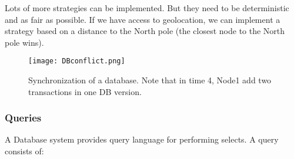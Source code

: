Lots of more strategies can be implemented. But they need to be deterministic and as fair as possible. If we have access to geolocation, we can implement a strategy based on a distance to the North pole (the closest node to the North pole wins).

\begin{figure}[h]
    \centering
    \texttt{[image: DBconflict.png]}
    \caption{Synchronization of a database. Note that in time 4, Node1 add two transactions in one DB version.}
    \label{databaseConflict}
\end{figure}

\subsubsection{Queries} 
A Database system provides query language for performing selects. A query consists of:
